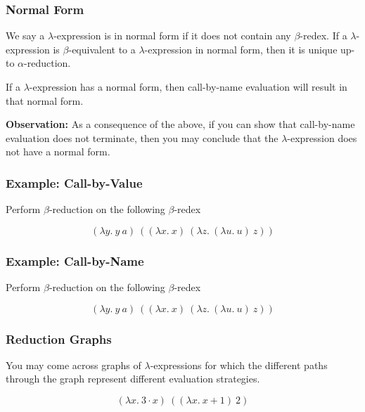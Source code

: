 \documentclass{beamer}
\begin{document}
\begin{frame}
	\frametitle{Normal Form}

	We say a $\lambda$-expression is in normal form if it does not contain any $\beta$-redex. If a $\lambda$-expression is $\beta$-equivalent to a $\lambda$-expression in normal form, then it is unique up-to $\alpha$-reduction. 

	\vspace{0.5cm}

	If a $\lambda$-expression has a normal form, then call-by-name evaluation will result in that normal form. 

	\vspace{0.5cm}

	{\bf Observation:} As a consequence of the above, if you can show that call-by-name evaluation does not terminate, then you may conclude that the $\lambda$-expression does not have a normal form. 

	\vspace{2cm}

\end{frame}

\begin{frame}
	\frametitle{Example: Call-by-Value}

	Perform $\beta$-reduction on the following $\beta$-redex

	$$(\lambda y. \ y \ a) \ ((\lambda x. \ x) \ (\lambda z. \ (\lambda u. \ u) \ z))$$

	\vspace{6cm}	
		
\end{frame}

\begin{frame}
	\frametitle{Example: Call-by-Name}

	Perform $\beta$-reduction on the following $\beta$-redex

	$$(\lambda y. \ y \ a) \ ((\lambda x. \ x) \ (\lambda z. \ (\lambda u. \ u) \ z))$$

	\vspace{6cm}	
		
\end{frame}

\begin{frame}
	\frametitle{Reduction Graphs}

	You may come across graphs of $\lambda$-expressions for which the different paths through the graph represent different evaluation strategies. 

	$$(\lambda x. \ 3\cdot x) \ ((\lambda x. \ x + 1) \ 2) $$
	\vspace{5cm}

\end{frame}
\end{document}
